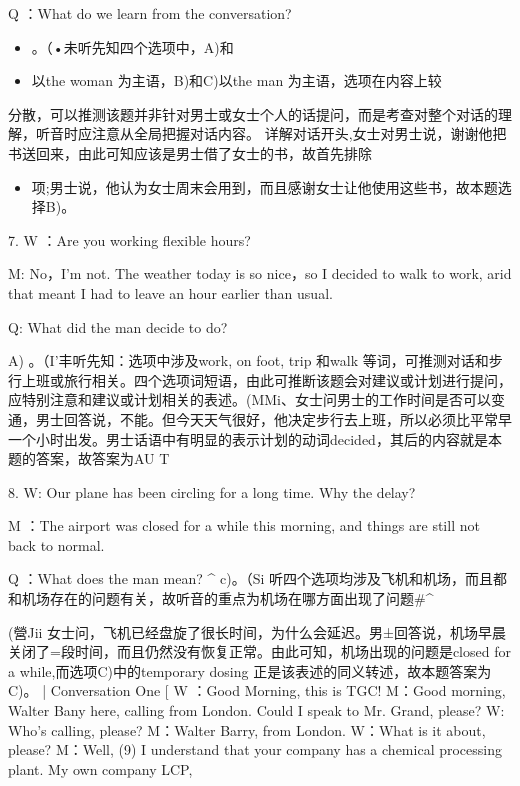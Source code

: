 \documentclass[UTF8,11pt]{ctexart}
\begin{document}
Q ：What do we learn from the conversation?


\begin{itemize}[leftmargin=2em,itemsep=.2em,topsep=.4em]\item[B.] 。（•未听先知四个选项中，A)和
\item[D.] 以the woman 为主语，B)和C)以the man 为主语，选项在内容上较
\end{itemize}

分散，可以推测该题并非针对男士或女士个人的话提问，而是考查对整个对话的理解，听音时应注意从全局把握对话内容。 详解对话开头,女士对男士说，谢谢他把书送回来，由此可知应该是男士借了女士的书，故首先排除


\begin{itemize}[leftmargin=2em,itemsep=.2em,topsep=.4em]\item[C.] 项;男士说，他认为女士周末会用到，而且感谢女士让他使用这些书，故本题选择B)。
\end{itemize}

7. W ：Are you working flexible hours?


M: No，I’m not. The weather today is so nice，so I decided to walk to work, arid that meant I had to leave an hour earlier than usual.


Q: What did the man decide to do?


A) 。（I’丰听先知：选项中涉及work, on foot, trip 和walk 等词，可推测对话和步行上班或旅行相关。四个选项词短语，由此可推断该题会对建议或计划进行提问，应特别注意和建议或计划相关的表述。(MMi、女士问男士的工作时间是否可以变通，男士回答说，不能。但今天天气很好，他决定步行去上班，所以必须比平常早一个小时出发。男士话语中有明显的表示计划的动词decided，其后的内容就是本题的答案，故答案为AU T


8. W: Our plane has been circling for a long time. Why the delay?


M ：The airport was closed for a while this morning, and things are still not back to normal.


Q ：What does the man mean? \textasciicircum{} c)。（Si 听四个选项均涉及飞机和机场，而且都和机场存在的问题有关，故听音的重点为机场在哪方面出现了问题\#\textasciicircum{}


(營Jii 女士问，飞机已经盘旋了很长时间，为什么会延迟。男±回答说，机场早晨关闭了=段时间，而且仍然没有恢复正常。由此可知，机场出现的问题是closed for a while,而选项C)中的temporary dosing 正是该表述的同义转述，故本题答案为C)。 | Conversation One [ W ：Good Morning, this is TGC! M：Good morning, Walter Bany here, calling from London. Could I speak to Mr. Grand, please? W: Who’s calling, please? M：Walter Barry, from London. W：What is it about, please? M：Well, (9) I understand that your company has a chemical processing plant. My own company LCP,
\end{document}
